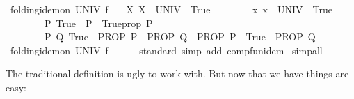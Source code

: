 \begin{isabellebody}
\isamarkupfalse%
\ folding{\isacharunderscore}{\kern0pt}idem{\isacharunderscore}{\kern0pt}on\ UNIV\ f\isanewline
\ \ \ {\isachardoublequoteopen}{\isasymAnd}X{\isachardot}{\kern0pt}\ {\isacharparenleft}{\kern0pt}X\ {\isasymsubseteq}\ UNIV{\isacharparenright}{\kern0pt}\ {\isasymequiv}\ True{\isachardoublequoteclose}\isanewline
\ \ \ \ \ \ \ \ {\isachardoublequoteopen}{\isasymAnd}x{\isachardot}{\kern0pt}\ x\ {\isasymin}\ UNIV\ {\isasymequiv}\ True{\isachardoublequoteclose}\isanewline
\ \ \ \ \ \ \ \ {\isachardoublequoteopen}{\isasymAnd}P{\isachardot}{\kern0pt}\ {\isacharparenleft}{\kern0pt}True\ {\isasymLongrightarrow}\ P{\isacharparenright}{\kern0pt}\ {\isasymequiv}\ Trueprop\ P{\isachardoublequoteclose}\isanewline
\ \ \ \ \ \ \ \ {\isachardoublequoteopen}{\isasymAnd}P\ Q{\isachardot}{\kern0pt}\ {\isacharparenleft}{\kern0pt}True\ {\isasymLongrightarrow}\ PROP\ P\ {\isasymLongrightarrow}\ PROP\ Q{\isacharparenright}{\kern0pt}\ {\isasymequiv}\ {\isacharparenleft}{\kern0pt}PROP\ P\ {\isasymLongrightarrow}\ True\ {\isasymLongrightarrow}\ PROP\ Q{\isacharparenright}{\kern0pt}{\isachardoublequoteclose}\isanewline
%
\isadelimproof
%
\endisadelimproof
%
\isatagproof
{}\isamarkupfalse%
\ {\isacharminus}{\kern0pt}\isanewline
\ \ \isamarkupfalse%
\ {\isachardoublequoteopen}folding{\isacharunderscore}{\kern0pt}idem{\isacharunderscore}{\kern0pt}on\ UNIV\ f{\isachardoublequoteclose}\isanewline
\ \ \ \ \isamarkupfalse%
\ standard\ {\isacharparenleft}{\kern0pt}simp\ add{\isacharcolon}{\kern0pt}\ comp{\isacharunderscore}{\kern0pt}fun{\isacharunderscore}{\kern0pt}idem{\isacharparenright}{\kern0pt}\isanewline
{}\isamarkupfalse%
\ simp{\isacharunderscore}{\kern0pt}all%
\endisatagproof
{\isafoldproof}%
%
\isadelimproof
\isanewline
%
\endisadelimproof
\isanewline
{}\isamarkupfalse%
%
\isadelimdocument
%
\endisadelimdocument
%
\isatagdocument
%
\isamarkuptrue%
%
\endisatagdocument
{\isafolddocument}%
%
\isadelimdocument
%
\endisadelimdocument
%
\begin{isamarkuptext}%
The traditional definition
  is ugly to work with.
  But now that we have  things are easy:%

\end{isamarkuptext}
\end{isabellebody}
